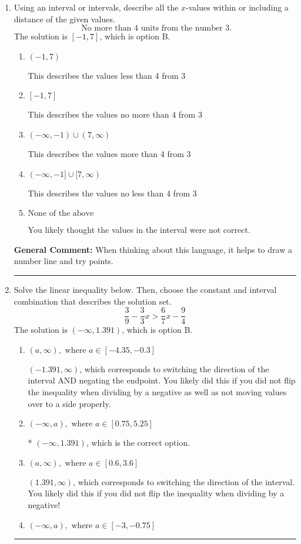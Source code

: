 \documentclass{extbook}[14pt]
\newcommand{\litem}[1]{\item #1

\rule{\textwidth}{0.4pt}}
\begin{document}
\begin{enumerate}\litem{
Using an interval or intervals, describe all the $x$-values within or including a distance of the given values.
\[ \text{ No more than } 4 \text{ units from the number } 3. \]The solution is \( [-1, 7] \), which is option B.\begin{enumerate}[label=\Alph*.]
\item \( (-1, 7) \)

This describes the values less than 4 from 3
\item \( [-1, 7] \)

This describes the values no more than 4 from 3
\item \( (-\infty, -1) \cup (7, \infty) \)

This describes the values more than 4 from 3
\item \( (-\infty, -1] \cup [7, \infty) \)

This describes the values no less than 4 from 3
\item \( \text{None of the above} \)

You likely thought the values in the interval were not correct.
\end{enumerate}

\textbf{General Comment:} When thinking about this language, it helps to draw a number line and try points.
}
\litem{
Solve the linear inequality below. Then, choose the constant and interval combination that describes the solution set.
\[ \frac{3}{9} - \frac{3}{3} x > \frac{6}{7} x - \frac{9}{4} \]The solution is \( (-\infty, 1.391) \), which is option B.\begin{enumerate}[label=\Alph*.]
\item \( (a, \infty), \text{ where } a \in [-4.35, -0.3] \)

 $(-1.391, \infty)$, which corresponds to switching the direction of the interval AND negating the endpoint. You likely did this if you did not flip the inequality when dividing by a negative as well as not moving values over to a side properly.
\item \( (-\infty, a), \text{ where } a \in [0.75, 5.25] \)

* $(-\infty, 1.391)$, which is the correct option.
\item \( (a, \infty), \text{ where } a \in [0.6, 3.6] \)

 $(1.391, \infty)$, which corresponds to switching the direction of the interval. You likely did this if you did not flip the inequality when dividing by a negative!
\item \( (-\infty, a), \text{ where } a \in [-3, -0.75] \)


\end{enumerate}}
\end{enumerate}
\end{document}
